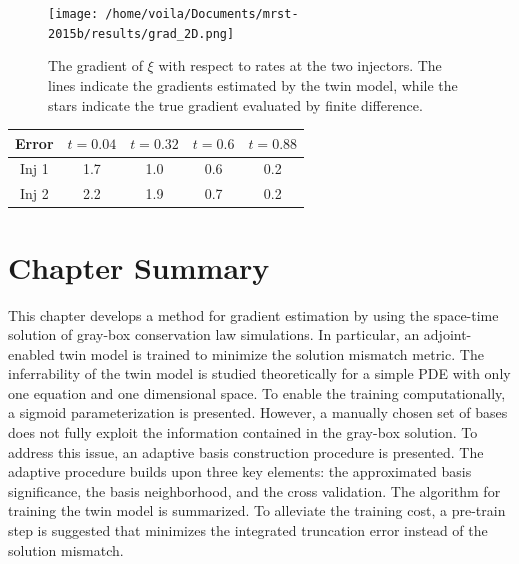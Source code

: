 \begin{figure}[htbp]
    \begin{center}
        \texttt{[image: /home/voila/Documents/mrst-2015b/results/grad\_2D.png]}
        \caption{The gradient of $\xi$ with respect to rates at the two injectors.
                 The lines indicate the gradients estimated by the twin model, while
                 the stars indicate the true gradient evaluated by finite difference.}
        \label{fig: reservoir 3D gradient}
    \end{center}
\end{figure}

\begin{center}
    \begin{tabular}{|c|c|c|c|c|}
       \hline\hline
         Error & $t=0.04$ & $t=0.32$ & $t=0.6$ & $t=0.88$\\
       \hline
       Inj 1 & 1.7  & 1.0 & 0.6 & 0.2 \\
       \hline
       Inj 2 & 2.2 &  1.9 & 0.7 & 0.2 \\
       \hline\hline
    \end{tabular}
    \label{tab: reservoir 3D grad error}
\end{center}


\section{Chapter Summary}
\label{sec: chap 2 summary}
This chapter develops a method for gradient estimation by using the space-time solution of
gray-box conservation law simulations. In particular, an adjoint-enabled twin model 
is trained to minimize the solution mismatch metric.
The inferrability of the twin model is studied theoretically for a simple PDE with only one equation
and one dimensional space. 
To enable the training computationally, a sigmoid parameterization
is presented. However, a manually chosen set of bases
does not fully exploit the information contained in the
gray-box solution. To address this issue,
an adaptive basis construction procedure is presented. The adaptive 
procedure  builds upon three key elements: the approximated basis significance,
the basis neighborhood, and the cross validation. The algorithm for training the twin model
is summarized. To alleviate the training cost, a pre-train step is suggested
that minimizes the integrated truncation error instead of the solution mismatch.\\

